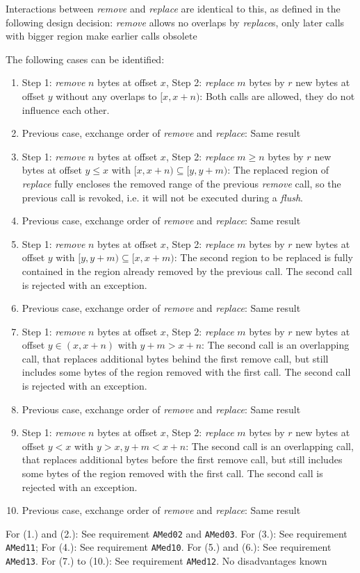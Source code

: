 Interactions between \emph{remove} and \emph{replace} are identical to this, as defined in the following design decision:
{%
\emph{remove} allows no overlaps by \emph{replace}s, only later calls with bigger region make earlier calls obsolete
}
{%
The following cases can be identified:
\begin{enumerate}
\item Step 1: \emph{remove} $n$ bytes at offset $x$, Step 2: \emph{replace} $m$ bytes by $r$ new bytes at offset $y$ without any overlaps to $[x,x+n)$: Both calls are allowed, they do not influence each other.
\item Previous case, exchange order of \emph{remove} and \emph{replace}: Same result
\item Step 1: \emph{remove} $n$ bytes at offset $x$, Step 2: \emph{replace} $m\geq n$ bytes by $r$ new bytes at offset $y\leq x$ with $[x,x+n)\subseteq [y,y+m)$: The replaced region of \emph{replace} fully encloses the removed range of the previous \emph{remove} call, so the previous call is revoked, i.e. it will not be executed during a \emph{flush}.
\item Previous case, exchange order of \emph{remove} and \emph{replace}: Same result
\item Step 1: \emph{remove} $n$ bytes at offset $x$, Step 2: \emph{replace} $m$ bytes by $r$ new bytes at offset $y$ with $[y,y+m)\subseteq [x,x+m)$: The second region to be replaced is fully contained in the region already removed by the previous call. The second call is rejected with an exception.
\item Previous case, exchange order of \emph{remove} and \emph{replace}: Same result
\item Step 1: \emph{remove} $n$ bytes at offset $x$, Step 2: \emph{replace} $m$ bytes by $r$ new bytes at offset $y\in (x,x+n)$ with $y+m>x+n$: The second call is an overlapping call, that replaces additional bytes behind the first remove call, but still includes some bytes of the region removed with the first call. The second call is rejected with an exception.
\item Previous case, exchange order of \emph{remove} and \emph{replace}: Same result
\item Step 1: \emph{remove} $n$ bytes at offset $x$, Step 2: \emph{replace} $m$ bytes by $r$ new bytes at offset $y<x$ with $y>x, y+m<x+n$: The second call is an overlapping call, that replaces additional bytes before the first remove call, but still includes some bytes of the region removed with the first call. The second call is rejected with an exception.
\item Previous case, exchange order of \emph{remove} and \emph{replace}: Same result
\end{enumerate}
}
{%
For (1.) and (2.): See requirement \texttt{AMed02} and \texttt{AMed03}. For (3.): See requirement \texttt{AMed11}; For (4.): See requirement \texttt{AMed10}. For (5.) and (6.): See requirement \texttt{AMed13}. For (7.) to (10.): See requirement \texttt{AMed12}.
}
{%
No disadvantages known
}

